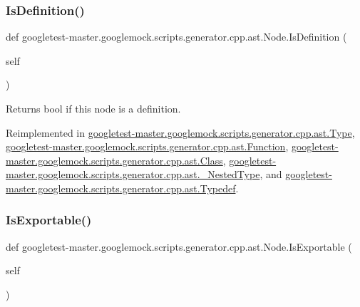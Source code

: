 \subsubsection{\texorpdfstring{IsDefinition()}{IsDefinition()}}
{\footnotesize\ttfamily def googletest-\/master.\+googlemock.\+scripts.\+generator.\+cpp.\+ast.\+Node.\+Is\+Definition (\begin{DoxyParamCaption}\item[{}]{self }\end{DoxyParamCaption})}

\begin{DoxyVerb}Returns bool if this node is a definition.\end{DoxyVerb}
 

Reimplemented in \mbox{\hyperlink{classgoogletest-master_1_1googlemock_1_1scripts_1_1generator_1_1cpp_1_1ast_1_1_type_a58246ca8e8f741d181add7c37bada058}{googletest-\/master.\+googlemock.\+scripts.\+generator.\+cpp.\+ast.\+Type}}, \mbox{\hyperlink{classgoogletest-master_1_1googlemock_1_1scripts_1_1generator_1_1cpp_1_1ast_1_1_function_a1344d79b1122eb8fe60e455deb03d83e}{googletest-\/master.\+googlemock.\+scripts.\+generator.\+cpp.\+ast.\+Function}}, \mbox{\hyperlink{classgoogletest-master_1_1googlemock_1_1scripts_1_1generator_1_1cpp_1_1ast_1_1_class_a79ec9f801f17c9f4d7868e0b1d10d10d}{googletest-\/master.\+googlemock.\+scripts.\+generator.\+cpp.\+ast.\+Class}}, \mbox{\hyperlink{classgoogletest-master_1_1googlemock_1_1scripts_1_1generator_1_1cpp_1_1ast_1_1___nested_type_ab4793fa112920ab7fdf96f1620880d7d}{googletest-\/master.\+googlemock.\+scripts.\+generator.\+cpp.\+ast.\+\_\+\+Nested\+Type}}, and \mbox{\hyperlink{classgoogletest-master_1_1googlemock_1_1scripts_1_1generator_1_1cpp_1_1ast_1_1_typedef_a3ce577b73ec6e341fe2848a7ff54dffa}{googletest-\/master.\+googlemock.\+scripts.\+generator.\+cpp.\+ast.\+Typedef}}.

\mbox{\label{classgoogletest-master_1_1googlemock_1_1scripts_1_1generator_1_1cpp_1_1ast_1_1_node_a84e05fc36f3b1f650b0aad690ef91c3a}} 
\subsubsection{\texorpdfstring{IsExportable()}{IsExportable()}}
{\footnotesize\ttfamily def googletest-\/master.\+googlemock.\+scripts.\+generator.\+cpp.\+ast.\+Node.\+Is\+Exportable (\begin{DoxyParamCaption}\item[{}]{self }\end{DoxyParamCaption})}


